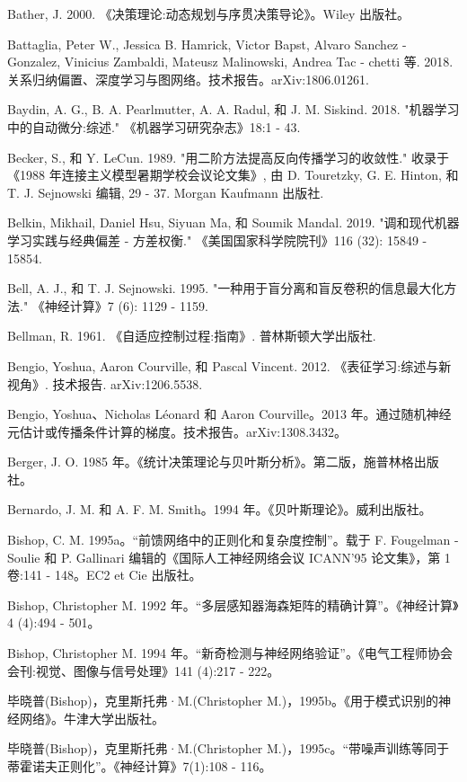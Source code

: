 \documentclass[10pt]{article}
\begin{document}
Bather, J. 2000. 《决策理论:动态规划与序贯决策导论》。Wiley 出版社。

Battaglia, Peter W., Jessica B. Hamrick, Victor Bapst, Alvaro Sanchez - Gonzalez, Vinicius Zambaldi, Mateusz Malinowski, Andrea Tac - chetti 等. 2018. 关系归纳偏置、深度学习与图网络。技术报告。arXiv:1806.01261.

Baydin, A. G., B. A. Pearlmutter, A. A. Radul, 和 J. M. Siskind. 2018. "机器学习中的自动微分:综述." 《机器学习研究杂志》18:1 - 43.

Becker, S., 和 Y. LeCun. 1989. "用二阶方法提高反向传播学习的收敛性." 收录于《1988 年连接主义模型暑期学校会议论文集》, 由 D. Touretzky, G. E. Hinton, 和 T. J. Sejnowski 编辑, 29 - 37. Morgan Kaufmann 出版社.

Belkin, Mikhail, Daniel Hsu, Siyuan Ma, 和 Soumik Mandal. 2019. "调和现代机器学习实践与经典偏差 - 方差权衡." 《美国国家科学院院刊》116 (32): 15849 - 15854.

Bell, A. J., 和 T. J. Sejnowski. 1995. "一种用于盲分离和盲反卷积的信息最大化方法." 《神经计算》7 (6): 1129 - 1159.

Bellman, R. 1961. 《自适应控制过程:指南》. 普林斯顿大学出版社.

Bengio, Yoshua, Aaron Courville, 和 Pascal Vincent. 2012. 《表征学习:综述与新视角》. 技术报告. arXiv:1206.5538.

Bengio, Yoshua、Nicholas Léonard 和 Aaron Courville。2013 年。通过随机神经元估计或传播条件计算的梯度。技术报告。arXiv:1308.3432。

Berger, J. O. 1985 年。《统计决策理论与贝叶斯分析》。第二版，施普林格出版社。

Bernardo, J. M. 和 A. F. M. Smith。1994 年。《贝叶斯理论》。威利出版社。

Bishop, C. M. 1995a。“前馈网络中的正则化和复杂度控制”。载于 F. Fougelman - Soulie 和 P. Gallinari 编辑的《国际人工神经网络会议 ICANN'95 论文集》，第 1 卷:141 - 148。EC2 et Cie 出版社。

Bishop, Christopher M. 1992 年。“多层感知器海森矩阵的精确计算”。《神经计算》4 (4):494 - 501。

Bishop, Christopher M. 1994 年。“新奇检测与神经网络验证”。《电气工程师协会会刊:视觉、图像与信号处理》141 (4):217 - 222。

毕晓普(Bishop)，克里斯托弗·M.(Christopher M.)，1995b。《用于模式识别的神经网络》。牛津大学出版社。

毕晓普(Bishop)，克里斯托弗·M.(Christopher M.)，1995c。“带噪声训练等同于蒂霍诺夫正则化”。《神经计算》7(1):108 - 116。
\end{document}

